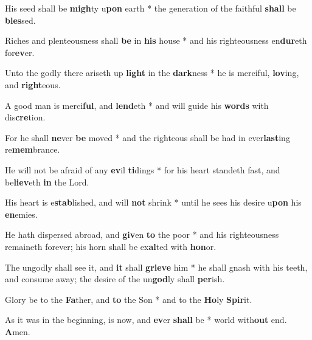 \begin{multicols}{2}
	His seed shall be \textbf{migh}ty u\textbf{pon} earth * the generation of the faithful \textbf{shall} be \textbf{bles}sed.
	
	Riches and plenteousness shall \textbf{be} in \textbf{his} house * and his righteousness en\textbf{dur}eth for\textbf{ev}er.
	
	Unto the godly there ariseth up \textbf{light} in the \textbf{dark}ness * he is merciful, \textbf{lov}ing, and \textbf{right}eous.
	
	A good man is merci\textbf{ful}, and \textbf{lend}eth * and will guide his \textbf{words} with dis\textbf{cre}tion.
	
	For he shall \textbf{ne}ver \textbf{be} moved * and the righteous shall be had in ever\textbf{last}ing re\textbf{mem}brance.
	
	He will not be afraid of any \textbf{ev}il \textbf{ti}dings * for his heart standeth fast, and be\textbf{liev}eth \textbf{in} the Lord.
	
	His heart is e\textbf{stab}lished, and will \textbf{not} shrink * until he sees his desire u\textbf{pon} his \textbf{en}emies.
	
	He hath dispersed abroad, and \textbf{giv}en \textbf{to} the poor * and his righteousness remaineth forever; his horn shall be ex\textbf{al}ted with \textbf{hon}or.
	
	The ungodly shall see it, and \textbf{it} shall \textbf{grieve} him * he shall gnash with his teeth, and consume away; the desire of the un\textbf{god}ly shall \textbf{per}ish.
	
	Glory be to the \textbf{Fa}ther, and \textbf{to} the Son * and to the \textbf{Ho}ly \textbf{Spir}it.
	
	As it was in the beginning, is now, and \textbf{ev}er \textbf{shall} be * world with\textbf{out} end. \textbf{A}men.
\end{multicols}